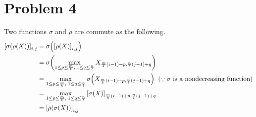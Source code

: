 \documentclass[10pt]{article}
\begin{document}
\section*{Problem 4}
Two functions $\sigma$ and $\rho$ are commute as the following.
\begin{align*}
    \qty[\sigma(\rho(X))]_{i, j} &= \sigma\qty(\qty[\rho(X)]_{i, j}) \\
    &= \sigma\qty(\max_{1 \leq p \leq \frac{m}{k}, \;  1 \leq q \leq \frac{n}{l}}{X_{\frac{m}{k}(i-1) + p, \frac{n}{l}(j-1) + q}}) \\
    &= \max_{1 \leq p \leq \frac{m}{k}, \;  1 \leq q \leq \frac{n}{l}}\sigma\qty(X_{\frac{m}{k}(i-1) + p, \frac{n}{l}(j-1) + q}) \;\; (\because \sigma\text{ is a nondecreasing function}) \\
    &= \max_{1 \leq p \leq \frac{m}{k}, \;  1 \leq q \leq \frac{n}{l}}\qty[\sigma\qty(X)]_{\frac{m}{k}(i-1) + p, \frac{n}{l}(j-1) + q} \\
    &= \qty[\rho(\sigma(X))]_{i, j}
\end{align*}
\end{document}
